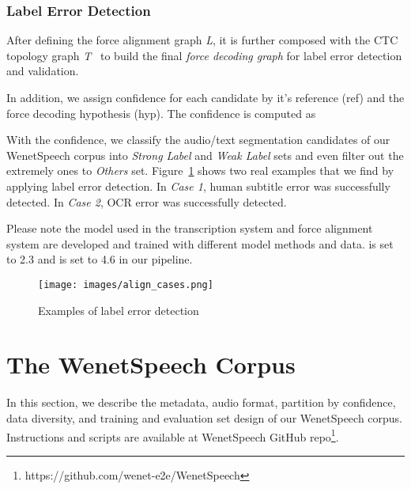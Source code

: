 \documentclass{article}
\begin{document}
\vspace{-0.5em}
\subsubsection{Label Error Detection}
\label{sec:label_error_detection}
\vspace{-0.5em}

After defining the force alignment graph \textit{L}, it is further composed with the CTC topology graph \textit{T}~\cite{miao2015eesen} to build the final \textit{force decoding graph}  for label error detection and validation.

In addition, we assign confidence for each candidate by it's reference (ref) and the force decoding hypothesis (hyp). The confidence  is computed as
\vspace{-1em}


With the confidence, we classify the audio/text segmentation candidates of our WenetSpeech corpus into \textit{Strong Label} and \textit{Weak Label} sets and even filter out the extremely ones to \textit{Others} set. Figure~\ref{fig:align_cases} shows two real examples that we find by applying label error detection. In \textit{Case 1}, human subtitle error was successfully detected. In \textit{Case 2}, OCR error was successfully detected.

Please note the model used in the transcription system and force alignment system are developed and trained with different model methods and data.
 is set to 2.3 and  is set to 4.6 in our pipeline.

\begin{figure}[ht]
  \vspace{-1em}
  \centering
  \texttt{[image: images/align\_cases.png]}
  \vspace{-2em}
  \caption{Examples of label error detection}
  \label{fig:align_cases}
  \vspace{-1em}
\end{figure}






\vspace{-1.3em}
\section{The WenetSpeech Corpus}\label{sec:corpus}
\vspace{-1em}
In this section, we describe the metadata, audio format, partition by confidence, data diversity, and training and evaluation set design of our WenetSpeech corpus. Instructions and scripts are available at WenetSpeech GitHub repo\footnote{https://github.com/wenet-e2e/WenetSpeech}. 
\end{document}
